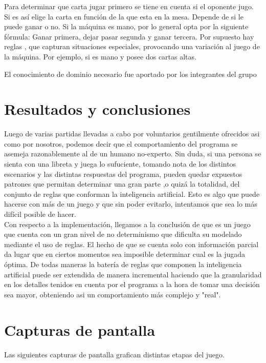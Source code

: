 \documentclass[12pt,a4paper]{article}
\begin{document}
Para determinar que carta jugar primero se tiene en cuenta si el oponente jugo. Si es as\'i elige la carta en 
funci\'on de la que esta en la mesa. Depende de si le puede ganar o no.
Si la m\'aquina es mano, por lo general opta por la siguiente f\'ormula: Ganar primera, dejar pasar segunda y ganar tercera. 
Por supuesto hay reglas , que capturan situaciones especiales, provocando una variaci\'on al juego de la m\'aquina. Por ejemplo, si es mano y posee dos cartas altas.


El conocimiento de dominio necesario fue aportado por los integrantes del grupo 

\section{Resultados y conclusiones}
Luego de varias partidas llevadas a cabo por voluntarios gentilmente ofrecidos asi como por nosotros,
podemos decir que el comportamiento del programa se asemeja razonablemente al de un humano no-experto. 
Sin duda, si una persona se sienta con una libreta y juega lo sufuciente, tomando nota de los distintos escenarios y las
distintas respuestas del programa, pueden quedar expuestos patrones que permitan determinar una gran parte
,o quiz\'a la totalidad, del conjunto de reglas que conforman la inteligencia artificial. Esto es algo
que puede hacerse con m\'as de un juego y que sin poder evitarlo, intentamos que sea lo m\'as dif\'icil
posible de hacer. \\
Con respecto a la implementaci\'on, llegamos a la conclusi\'on de que es un juego que cuenta con un 
gran nivel de no determinismo que dificulta su modelado mediante el uso de reglas. El hecho
de que se cuenta solo con informaci\'on parcial da lugar que en ciertos momentos sea imposible determinar 
cual es la jugada \'optima.
De todas maneras la bater\'ia de reglas que componen la inteligencia artificial puede ser extendida de 
manera incremental haciendo que la granularidad en los detalles tenidos en cuenta por el programa
a la hora de tomar una decisi\'on sea mayor, obteniendo asi un comportamiento m\'as complejo 
y "real".

\section{Capturas de pantalla}
Las siguientes capturas de pantalla grafican distintas etapas del juego.
\end{document}
